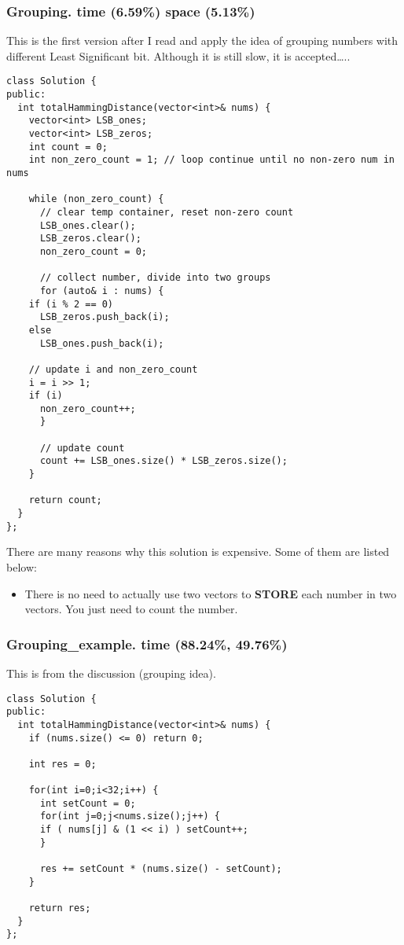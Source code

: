 \documentclass[12pt]{book}
\begin{document}
\subsubsection{Grouping. time (6.59\%) space (5.13\%)}
\label{sec:org8f02171}
This is the first version after I read and apply the idea of grouping numbers with different Least Significant bit. Although it is still slow, it is accepted\ldots{}..
\begin{verbatim}
class Solution {
public:
  int totalHammingDistance(vector<int>& nums) {
    vector<int> LSB_ones;
    vector<int> LSB_zeros;
    int count = 0;
    int non_zero_count = 1; // loop continue until no non-zero num in nums

    while (non_zero_count) {
      // clear temp container, reset non-zero count
      LSB_ones.clear();
      LSB_zeros.clear();
      non_zero_count = 0;

      // collect number, divide into two groups
      for (auto& i : nums) {
	if (i % 2 == 0)
	  LSB_zeros.push_back(i);
	else 
	  LSB_ones.push_back(i);

	// update i and non_zero_count
	i = i >> 1;
	if (i)
	  non_zero_count++;
      }

      // update count 
      count += LSB_ones.size() * LSB_zeros.size();
    }

    return count;
  }
};
\end{verbatim}

There are many reasons why this solution is expensive. Some of them are listed below:
\begin{itemize}
\item There is no need to actually use two vectors to \textbf{STORE} each number in two vectors. You just need to count the number.
\end{itemize}
\subsubsection{Grouping\_example. time (88.24\%, 49.76\%)}
\label{sec:org17f5241}
This is from the discussion (grouping idea).
\begin{verbatim}
class Solution {
public:
  int totalHammingDistance(vector<int>& nums) {
    if (nums.size() <= 0) return 0;

    int res = 0;

    for(int i=0;i<32;i++) {
      int setCount = 0;
      for(int j=0;j<nums.size();j++) {
	  if ( nums[j] & (1 << i) ) setCount++;
      }

      res += setCount * (nums.size() - setCount);
    }

    return res;
  }
};
\end{verbatim}
\end{document}
